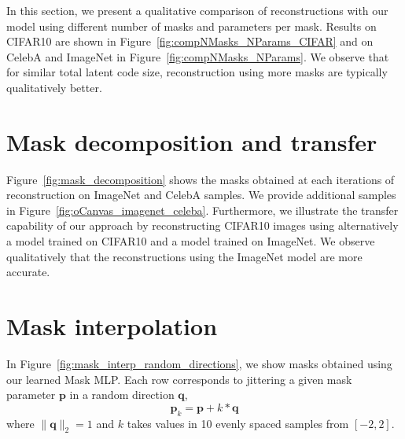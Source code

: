 \documentclass[10pt,twocolumn,letterpaper]{article}
\begin{document}
In this section, we present a qualitative comparison of reconstructions with our model using different number of masks and parameters per mask. Results on CIFAR10 are shown in Figure~\ref{fig:compNMasks_NParams_CIFAR} and on CelebA and ImageNet in Figure~\ref{fig:compNMasks_NParams}. We observe that for similar total latent code size, reconstruction using more masks are typically qualitatively better.

\section{Mask decomposition and transfer}

Figure~\ref{fig:mask_decomposition} shows the masks obtained at each iterations of reconstruction on ImageNet and CelebA samples. We provide additional samples in Figure~\ref{fig:oCanvas_imagenet_celeba}.
Furthermore, we illustrate the transfer capability of our approach by reconstructing CIFAR10 images using alternatively a model trained on CIFAR10 and a model trained on ImageNet. We observe qualitatively that the reconstructions using the ImageNet model are more accurate.

\section{Mask interpolation}

In Figure~\ref{fig:mask_interp_random_directions}, we show masks obtained using our learned Mask MLP. Each row corresponds to jittering a given mask parameter $\textbf{p}$ in a random direction $\textbf{q}$, 
$$\textbf{p}_k = \textbf{p} + k*\textbf{q}$$
where $\lVert\textbf{q}\rVert_2 = 1$ and $k$ takes values in 10 evenly spaced samples from $[-2,2]$.
\end{document}
